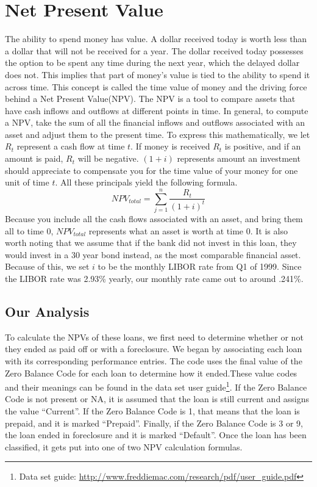 \documentclass[12 pt]{uncw_thesis}
\theoremstyle{plain}
\theoremstyle{remark}
\theoremstyle{definition}
\begin{document}
\section{Net Present Value}
The ability to spend money has value. A dollar received today is worth less than a dollar that will not be received for a year. The dollar received today possesses the option to be spent any time during the next year, which the delayed dollar does not. This implies that part of money's value is tied to the ability to spend it across time. This concept is called the time value of money and the driving force behind a Net Present Value(NPV). The NPV is a tool to compare assets that have cash inflows and outflows at different points in time. In general, to compute a NPV, take the sum of all the financial inflows and outflows associated with an asset and adjust them to the present time. To express this mathematically, we let \(R_t\) represent a cash flow at time \(t\). If money is received \(R_t\) is positive, and if an amount is paid, \(R_t\) will be negative. \((1+i)\) represents amount an investment should appreciate to compensate you for the time value of your money for one unit of time \(t\). All these principals yield the following formula. 
\[NPV_{total} = \sum_{j=1}^n \frac{R_t}{(1+i)^t}\]
Because you include all the cash flows associated with an asset, and bring them all to time 0, \(NPV_{total}\) represents what an asset is worth at time 0. It is also worth noting that we assume that if the bank did not invest in this loan, they would invest in a 30 year bond instead, as the most comparable financial asset. Because of this, we set \(i\) to be the monthly LIBOR rate from Q1 of 1999. Since the LIBOR rate was 2.93\% yearly, our monthly rate came out to around .241\%.
\subsection{Our Analysis}
To calculate the NPVs of these loans, we first need to determine whether or not they ended as paid off or with a foreclosure. We began by associating each loan with its corresponding performance entries. The code uses the final value of the Zero Balance Code for each loan to determine how it ended.These value codes and their meanings can be found in the data set user guide\footnote{Data set guide: \href{http://www.freddiemac.com/research/pdf/user\_guide.pdf}{http://www.freddiemac.com/research/pdf/user\_guide.pdf}}. If the Zero Balance Code is not present or NA, it is assumed that the loan is still current and assigns the value ``Current''. If the Zero Balance Code is 1, that means that the loan is prepaid, and it is marked ``Prepaid''. Finally, if the Zero Balance Code is 3 or 9, the loan ended in foreclosure and it is marked ``Default''. Once the loan has been classified, it gets put into one of two NPV calculation formulas.
\end{document}
